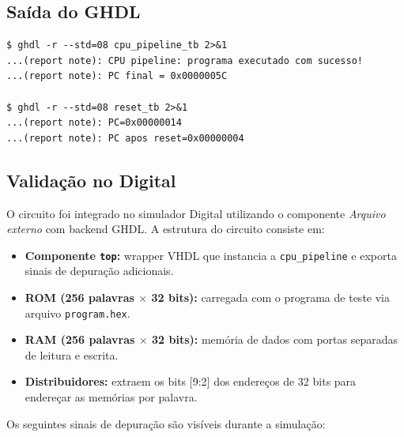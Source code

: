 \documentclass[12pt, a4paper]{article}
\newcommand{\code}[1]{\texttt{#1}}
\begin{document}
\subsection{Saída do GHDL}

\begin{lstlisting}[language={}, basicstyle=\ttfamily\small,
  backgroundcolor=\color{codebg}, frame=single, numbers=none]
$ ghdl -r --std=08 cpu_pipeline_tb 2>&1
...(report note): CPU pipeline: programa executado com sucesso!
...(report note): PC final = 0x0000005C

$ ghdl -r --std=08 reset_tb 2>&1
...(report note): PC=0x00000014
...(report note): PC apos reset=0x00000004
\end{lstlisting}

\subsection{Validação no Digital}

O circuito foi integrado no simulador Digital utilizando o componente
\textit{Arquivo externo} com backend GHDL. A estrutura do circuito consiste em:

\begin{itemize}[leftmargin=2em]
  \item \textbf{Componente \code{top}:} wrapper VHDL que instancia a
    \code{cpu\_pipeline} e exporta sinais de depuração adicionais.
  \item \textbf{ROM (256 palavras $\times$ 32 bits):} carregada com o programa
    de teste via arquivo \code{program.hex}.
  \item \textbf{RAM (256 palavras $\times$ 32 bits):} memória de dados com
    portas separadas de leitura e escrita.
  \item \textbf{Distribuidores:} extraem os bits {[}9:2{]} dos endereços de
    32 bits para endereçar as memórias por palavra.
\end{itemize}

Os seguintes sinais de depuração são visíveis durante a simulação:
\end{document}
